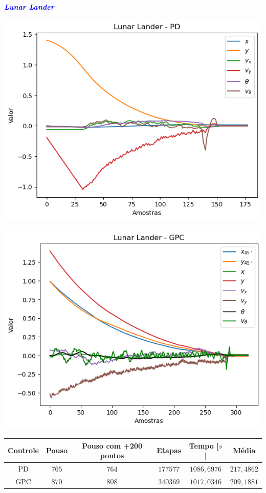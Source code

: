 \documentclass[aspectratio=169]{beamer}
\begin{document}
\begin{frame}{\textcolor{blue}{\textbf{\textit{Lunar Lander}}}}
\vspace{-.75cm}
\begin{minipage}{0.5\textwidth}
  \centering
  \includegraphics[scale=0.45]{images/llpid.png}
  \label{fig:imagem1}
\end{minipage}%
\begin{minipage}{0.5\textwidth}
  \centering
  \includegraphics[scale=0.45]{images/llgpc.png}
  \label{fig:imagem2}
\end{minipage}

\begin{table}[H]
	\centering
	\vspace*{-.2cm}
	\begin{tabular}{cccccc}
              \rowcolor{blue!30} Controle & Pouso & Pouso com +200 pontos & Etapas & Tempo [$s$] & Média\\
            \hline
            PD & $765$ & $764$ &  $177577$ & $1086,6976$ & $217,4862$\\
            GPC & $870$ & $808$  &  $340369$ & $1017,0346$ & $209,1881$\\ 
            \hline
	\end{tabular}  
    \label{tab:intll}                 %
\end{table}



\end{frame}
\end{document}
